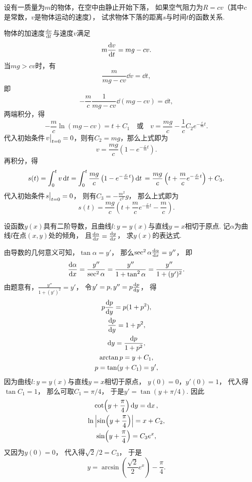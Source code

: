\begin{example}
设有一质量为\(m\)的物体，在空中由静止开始下落，
如果空气阻力为\(R = cv\)（其中\(c\)是常数，\(v\)是物体运动的速度），
试求物体下落的距离\(s\)与时间\(t\)的函数关系.
\begin{solution}
物体的加速度\(\dv{v}{t}\)与速度\(v\)满足\[
	m \dv{v}{t} = mg - cv.
\]
当\(mg>cv\)时，有\[
	\frac{m}{mg-cv} \dd{v} = \dd{t},
\]
即\[
	-\frac{m}{c} \frac{1}{mg-cv} \dd(mg-cv) = \dd{t},
\]
两端积分，得\[
	-\frac{m}{c} \ln(mg-cv) = t + C_1
	\quad\text{或}\quad
	v = \frac{mg}{c} - \frac{1}{c} C_2 e^{-\frac{c}{m} t}.
\]
代入初始条件\(\eval{v}_{t=0} = 0\)，则有\(C_2 = mg\)，那么上式即为\[
	v = \frac{mg}{c} \left( 1 - e^{-\frac{c}{m} t} \right).
\]
再积分，得\[
	s(t) = \int_0^t v \dd{t}
	= \int_0^t \frac{mg}{c} \left( 1 - e^{-\frac{c}{m} t} \right) \dd{t} \\
	= \frac{mg}{c} \left( t + \frac{m}{c} e^{-\frac{c}{m} t} \right) + C_3.
\]
代入初始条件\(\eval{s}_{t=0} = 0\)，
则有\(C_3 = -\frac{m^2}{c^2} g\)，
那么上式即为\[
	s(t) = \frac{mg}{c} \left( t + \frac{m}{c} e^{-\frac{c}{m} t} - \frac{m}{c} \right).
\]
\end{solution}
\end{example}

\begin{example}
设函数\(y(x)\)具有二阶导数，且曲线\(l: y=y(x)\)与直线\(y=x\)相切于原点.
记\(\alpha\)为曲线\(l\)在点\((x,y)\)处的倾角，
且\(\dv{\alpha}{x}=\dv{y}{x}\)，
求\(y(x)\)的表达式.
\begin{solution}
由导数的几何意义可知，\(\tan\alpha=y'\)，
那么\(\sec^2\alpha \dv{\alpha}{x} = y''\)，
即\[
	\dv{\alpha}{x} = \frac{y''}{\sec^2\alpha}
	= \frac{y''}{1+\tan^2\alpha}
	= \frac{y''}{1+(y')^2}.
\]
由题意有，\(\frac{y''}{1+(y')^2} = y'\)，
令\(y' = p,
y'' = p\dv{p}{y}\)，
得\begin{gather*}
	p\dv{p}{y} = p(1+p^2), \\
	\dv{p}{y} = 1+p^2, \\
	\dd{y} = \frac{\dd{p}}{1+p^2}, \\
	\arctan p = y + C_1, \\
	p = \tan(y+C_1) = y',
\end{gather*}
因为曲线\(l: y=y(x)\)与直线\(y=x\)相切于原点，
\(y(0) = 0\)，\(y'(0) = 1\)，
代入得\(\tan C_1 = 1\)，
那么可取\(C_1 = \pi/4\)，
于是\(y' = \tan(y+\pi/4)\).
因此\begin{gather*}
	\cot(y+\frac{\pi}{4}) \dd{y} = \dd{x}, \\
	\ln\abs{\sin(y+\frac{\pi}{4})} = x + C_2, \\
	\sin(y+\frac{\pi}{4}) = C_3 e^x,
\end{gather*}
又因为\(y(0) = 0\)，
代入得\(\sqrt{2}/2 = C_3\)，
于是\[
	y = \arcsin(\frac{\sqrt{2}}{2} e^x) - \frac{\pi}{4}.
\]
\end{solution}
\end{example}
